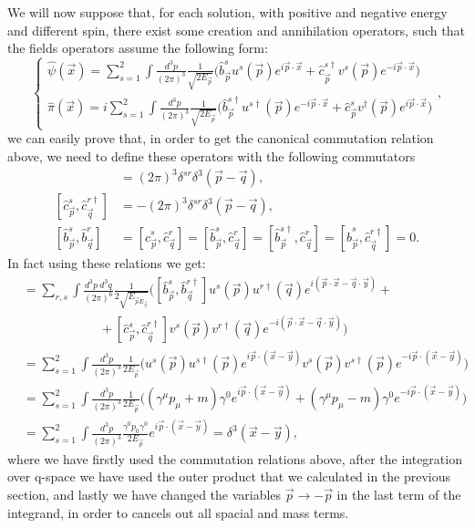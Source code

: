 We will now suppose that, for each solution, with positive and negative energy and different spin, there exist some creation and annihilation operators, such that the fields operators assume the following form:
\begin{equation*}
    \begin{cases}
        \hat{\psi}(\vec x)=\sum_{s=1}^{2}\int\frac{d^3p}{(2\pi)^3}\frac{1}{\sqrt{2E_{\vec p}}}\bigg(\hat{b}^s_{\vec p}u^s(\vec p)e^{i\vec p\cdot \vec x}+\hat{c}^{s\dagger}_{\vec p}v^s(\vec p)e^{-i\vec p\cdot \vec x}\bigg)\\
        \hat{\pi}(\vec x)=i\sum_{s=1}^{2}\int\frac{d^3p}{(2\pi)^3}\frac{1}{\sqrt{2E_{\vec p}}}\bigg(\hat{b}^{s\dagger}_{\vec p}u^{s\dagger}(\vec p)e^{-i\vec p\cdot \vec x}+\hat{c}^{s}_{\vec p}v^{\dagger}(\vec p)e^{i\vec p\cdot \vec x}\bigg)
    \end{cases},
\end{equation*}
we can easily prove that, in order to get the canonical commutation relation above, we need to define these operators with the following commutators
\begin{align*}
    [\hat{b}^s_{\vec p},\hat{b}^{r\dagger}_{\vec q}]&=(2\pi)^3\delta^{sr}\delta^3(\vec{ p}-\vec{ q}),\\ [\hat{c}^s_{\vec p},\hat{c}^{r\dagger}_{\vec q}]&=-(2\pi)^3\delta^{sr}\delta^3(\vec{ p}-\vec q),\\
    [\hat{b}^s_{\vec p},\hat{b}^{r}_{\vec q}]&=[\hat{c}^s_{\vec p},\hat{c}^{r}_{\vec q}]=[\hat{b}^s_{\vec p},\hat{c}^{r}_{\vec q}]=[\hat{b}^{s\dagger}_{\vec p},\hat{c}^{r}_{\vec q}]=[\hat{b}^{s}_{\vec p},\hat{c}^{r\dagger}_{\vec q}]=0.
\end{align*}
In fact using these relations we get:
\begin{align*}
    [\hat{\psi}_\alpha(\vec x),\hat{\pi}_\beta(\vec y)]&=\sum_{r,s}\int\frac{d^3p\ d^3q}{(2\pi)^6}\frac{1}{2\sqrt{E_{\vec{p}E_{\vec{q}}}}}\bigg([\hat{b}^s_{\vec p},\hat{b}^{r\dagger}_{\vec q}]u^s(\vec p)u^{r\dagger}(\vec q)e^{i(\vec p\cdot\vec x-\vec q\cdot\vec y)}+\\&\qquad\qquad\qquad+[\hat{c}^s_{\vec p},\hat{c}^{r\dagger}_{\vec q}]v^s(\vec p)v^{r\dagger}(\vec q)e^{-i(\vec p\cdot\vec x-\vec q\cdot\vec y)}\bigg)\\&=\sum_{s=1}^{2}\int\frac{d^3p}{(2\pi)^3}\frac{1}{2E_{\vec p}}\bigg(u^s(\vec p)u^{s\dagger}(\vec p)e^{i\vec p\cdot(\vec x-\vec y)}v^s(\vec p)v^{s\dagger}(\vec p)e^{-i\vec p\cdot(\vec x-\vec y)}\bigg)\\&=\sum_{s=1}^{2}\int\frac{d^3p}{(2\pi)^3}\frac{1}{2E_{\vec p}}\bigg((\gamma^\mu p_\mu+m)\gamma^0e^{i\vec p\cdot(\vec x-\vec y)}+(\gamma^\mu p_\mu-m)\gamma^0e^{-i\vec p\cdot(\vec x-\vec y)}\bigg)\\&=\sum_{s=1}^{2}\int\frac{d^3p}{(2\pi)^3}\frac{\gamma^0p_0\gamma^0}{2E_{\vec p}}e^{i\vec p\cdot(\vec x -\vec y)}=\delta^3(\vec x-\vec y),
\end{align*}
where we have firstly used the commutation relations above, after the integration over q-space we have used the outer product that we calculated in the previous section, and lastly we have changed the variables $\vec p\rightarrow-\vec p$ in the last term of the integrand, in order to cancels out all spacial and mass terms.\\

